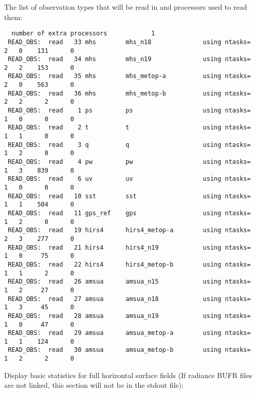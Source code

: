 The list of observation types that will be read in and processors used to read them:

\begin{scriptsize}
\begin{verbatim}
  number of extra processors            1
 READ_OBS:  read   33 mhs        mhs_n18              using ntasks=   2   0    131      0
 READ_OBS:  read   34 mhs        mhs_n19              using ntasks=   2   2    153      0
 READ_OBS:  read   35 mhs        mhs_metop-a          using ntasks=   2   0    563      0
 READ_OBS:  read   36 mhs        mhs_metop-b          using ntasks=   2   2      2      0
 READ_OBS:  read    1 ps         ps                   using ntasks=   1   0      0      0
 READ_OBS:  read    2 t          t                    using ntasks=   1   1      0      0
 READ_OBS:  read    3 q          q                    using ntasks=   1   2      0      0
 READ_OBS:  read    4 pw         pw                   using ntasks=   1   3    839      0
 READ_OBS:  read    6 uv         uv                   using ntasks=   1   0      0      0
 READ_OBS:  read   10 sst        sst                  using ntasks=   1   1    504      0
 READ_OBS:  read   11 gps_ref    gps                  using ntasks=   1   2      0      0
 READ_OBS:  read   19 hirs4      hirs4_metop-a        using ntasks=   2   3    277      0
 READ_OBS:  read   21 hirs4      hirs4_n19            using ntasks=   1   0     75      0
 READ_OBS:  read   22 hirs4      hirs4_metop-b        using ntasks=   1   1      2      0
 READ_OBS:  read   26 amsua      amsua_n15            using ntasks=   1   2     27      0
 READ_OBS:  read   27 amsua      amsua_n18            using ntasks=   1   3     45      0
 READ_OBS:  read   28 amsua      amsua_n19            using ntasks=   1   0     47      0
 READ_OBS:  read   29 amsua      amsua_metop-a        using ntasks=   1   1    124      0
 READ_OBS:  read   30 amsua      amsua_metop-b        using ntasks=   1   2      2      0
\end{verbatim}
\end{scriptsize}
Display basic statistics for full horizontal surface fields (If radiance BUFR files are not linked, this section will not be in the stdout file):

